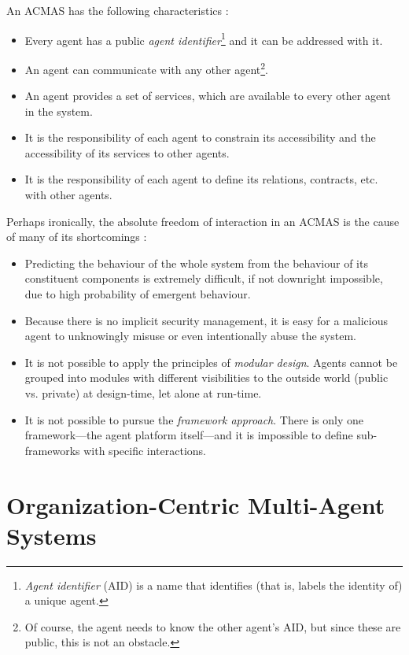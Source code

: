 An ACMAS has the following characteristics \cite{Ferber03}:
\begin{itemize}
	\item Every agent has a public \textit{agent identifier}\footnote{\textit{Agent identifier} (AID) is a name that identifies (that is, labels the identity of) a unique agent.} and it can be addressed with it.
	\item An agent can communicate with any other agent\footnote{Of course, the agent needs to know the other agent's AID, but since these are public, this is not an obstacle.}.
	\item An agent provides a set of services, which are available to every other agent in the system.
	\item It is the responsibility of each agent to constrain its accessibility and the accessibility of its services to other agents.
	\item It is the responsibility of each agent to define its relations, contracts, etc. with other agents.
\end{itemize}

Perhaps ironically, the absolute freedom of interaction in an ACMAS is the cause of many of its shortcomings \cite{Ferber03}:
\begin{itemize}
	\item Predicting the behaviour of the whole system from the behaviour of its constituent components is extremely difficult, if not downright impossible, due to high probability of emergent behaviour.
	\item Because there is no implicit security management, it is easy for a malicious agent to unknowingly misuse or even intentionally abuse the system.
	\item It is not possible to apply the principles of \textit{modular design}. Agents cannot be grouped into modules with different visibilities to the outside world (public vs. private) at design-time, let alone at run-time.
	\item It is not possible to pursue the \textit{framework approach}. There is only one framework---the agent platform itself---and it is impossible to define sub-frameworks with specific interactions.
\end{itemize}

\section{Organization-Centric Multi-Agent Systems}

